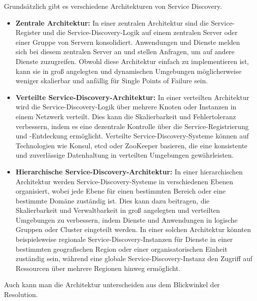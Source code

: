 \documentclass[../vs-script-first-v01.tex]{subfiles}
\begin{document}
Grundsätzlich gibt es verschiedene Architekturen von Service Discovery.
\begin{itemize}
\item \textbf{Zentrale Architektur:} In einer zentralen Architektur sind die Service-Register und die Service-Discovery-Logik auf einem zentralen Server oder einer Gruppe von Servern konsolidiert. Anwendungen und Dienste melden sich bei diesem zentralen Server an und stellen Anfragen, um auf andere Dienste zuzugreifen. Obwohl diese Architektur einfach zu implementieren ist, kann sie in groß angelegten und dynamischen Umgebungen möglicherweise weniger skalierbar und anfällig für Single Points of Failure sein.
\item \textbf{Verteilte Service-Discovery-Architektur:} In einer verteilten Architektur wird die Service-Discovery-Logik über mehrere Knoten oder Instanzen in einem Netzwerk verteilt. Dies kann die Skalierbarkeit und Fehlertoleranz verbessern, indem es eine dezentrale Kontrolle über die Service-Registrierung und -Entdeckung ermöglicht. Verteilte Service-Discovery-Systeme können auf Technologien wie Konsul, etcd oder ZooKeeper basieren, die eine konsistente und zuverlässige Datenhaltung in verteilten Umgebungen gewährleisten.

\item \textbf{Hierarchische Service-Discovery-Architektur:} In einer hierarchischen Architektur werden Service-Discovery-Systeme in verschiedenen Ebenen organisiert, wobei jede Ebene für einen bestimmten Bereich oder eine bestimmte Domäne zuständig ist. Dies kann dazu beitragen, die Skalierbarkeit und Verwaltbarkeit in groß angelegten und verteilten Umgebungen zu verbessern, indem Dienste und Anwendungen in logische Gruppen oder Cluster eingeteilt werden. In einer solchen Architektur könnten beispielsweise regionale Service-Discovery-Instanzen für Dienste in einer bestimmten geografischen Region oder einer organisatorischen Einheit zuständig sein, während eine globale Service-Discovery-Instanz den Zugriff auf Ressourcen über mehrere Regionen hinweg ermöglicht.
\end{itemize}

Auch kann man die Architektur unterscheiden aus dem Blickwinkel der Resolution. 
\end{document}

